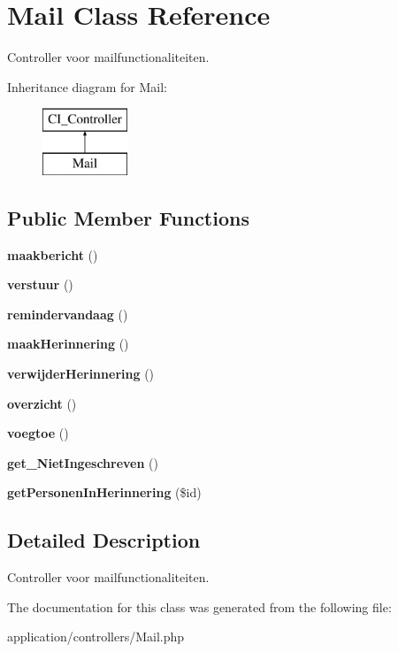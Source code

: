 \hypertarget{class_mail}{}\section{Mail Class Reference}
\label{class_mail}


Controller voor mailfunctionaliteiten.  


Inheritance diagram for Mail\+:\begin{figure}[H]
\begin{center}
\leavevmode
\includegraphics[height=2.000000cm]{class_mail}
\end{center}
\end{figure}
\subsection*{Public Member Functions}
\begin{DoxyCompactItemize}
\item 
\mbox{\label{class_mail_a9e19643f7bd6b63ac867a99a42513790}} 
{\bfseries maakbericht} ()
\item 
\mbox{\label{class_mail_a698adc5d93072946dbb03cb5e8025a92}} 
{\bfseries verstuur} ()
\item 
\mbox{\label{class_mail_a6b0bf7c864a3999c5b56222deb88874f}} 
{\bfseries remindervandaag} ()
\item 
\mbox{\label{class_mail_a51675a2d0d65414634e3a21067462014}} 
{\bfseries maak\+Herinnering} ()
\item 
\mbox{\label{class_mail_a5870a82a870b3b579d503101494abaf9}} 
{\bfseries verwijder\+Herinnering} ()
\item 
\mbox{\label{class_mail_abb72118b34523cae188c03dc72955d8c}} 
{\bfseries overzicht} ()
\item 
\mbox{\label{class_mail_a8a6872c776064a3e379e20b88533dfc8}} 
{\bfseries voegtoe} ()
\item 
\mbox{\label{class_mail_a981094d50056d958426564d48c95cce1}} 
{\bfseries get\+\_\+\+Niet\+Ingeschreven} ()
\item 
\mbox{\label{class_mail_af56bb11351090ce865a284a2c27ef3bb}} 
{\bfseries get\+Personen\+In\+Herinnering} (\$id)
\end{DoxyCompactItemize}


\subsection{Detailed Description}
Controller voor mailfunctionaliteiten. 

The documentation for this class was generated from the following file\+:\begin{DoxyCompactItemize}
\item 
application/controllers/Mail.\+php\end{DoxyCompactItemize}
